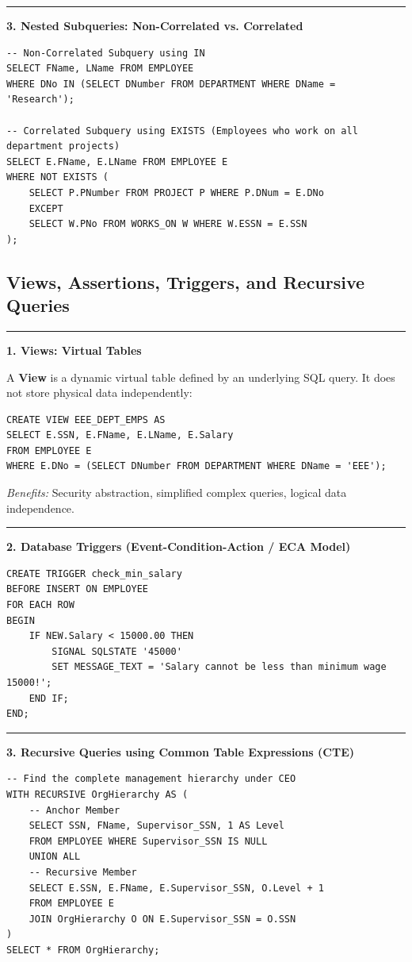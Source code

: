 \documentclass[11pt,a4paper]{article}
\newcommand{\concept}[1]{%
  \vspace{3pt}\noindent\textcolor{AnthGreen}{\rule{3.5pt}{10pt}}\enspace
  \textbf{\sffamily\color{AnthDark}#1}\par\vspace{2pt}%
}
\begin{document}
\concept{3. Nested Subqueries: Non-Correlated vs. Correlated}
\begin{lstlisting}
-- Non-Correlated Subquery using IN
SELECT FName, LName FROM EMPLOYEE 
WHERE DNo IN (SELECT DNumber FROM DEPARTMENT WHERE DName = 'Research');

-- Correlated Subquery using EXISTS (Employees who work on all department projects)
SELECT E.FName, E.LName FROM EMPLOYEE E 
WHERE NOT EXISTS (
    SELECT P.PNumber FROM PROJECT P WHERE P.DNum = E.DNo 
    EXCEPT 
    SELECT W.PNo FROM WORKS_ON W WHERE W.ESSN = E.SSN
);
\end{lstlisting}

\subsection{Views, Assertions, Triggers, and Recursive Queries}

\concept{1. Views: Virtual Tables}
A \textbf{View} is a dynamic virtual table defined by an underlying SQL query. It does not store physical data independently:
\begin{lstlisting}
CREATE VIEW EEE_DEPT_EMPS AS 
SELECT E.SSN, E.FName, E.LName, E.Salary 
FROM EMPLOYEE E 
WHERE E.DNo = (SELECT DNumber FROM DEPARTMENT WHERE DName = 'EEE');
\end{lstlisting}
\emph{Benefits:} Security abstraction, simplified complex queries, logical data independence.

\concept{2. Database Triggers (Event-Condition-Action / ECA Model)}
\begin{lstlisting}
CREATE TRIGGER check_min_salary 
BEFORE INSERT ON EMPLOYEE 
FOR EACH ROW 
BEGIN 
    IF NEW.Salary < 15000.00 THEN 
        SIGNAL SQLSTATE '45000' 
        SET MESSAGE_TEXT = 'Salary cannot be less than minimum wage 15000!';
    END IF; 
END;
\end{lstlisting}

\concept{3. Recursive Queries using Common Table Expressions (CTE)}
\begin{lstlisting}
-- Find the complete management hierarchy under CEO
WITH RECURSIVE OrgHierarchy AS (
    -- Anchor Member
    SELECT SSN, FName, Supervisor_SSN, 1 AS Level 
    FROM EMPLOYEE WHERE Supervisor_SSN IS NULL 
    UNION ALL 
    -- Recursive Member
    SELECT E.SSN, E.FName, E.Supervisor_SSN, O.Level + 1 
    FROM EMPLOYEE E 
    JOIN OrgHierarchy O ON E.Supervisor_SSN = O.SSN
)
SELECT * FROM OrgHierarchy;
\end{lstlisting}
\end{document}
